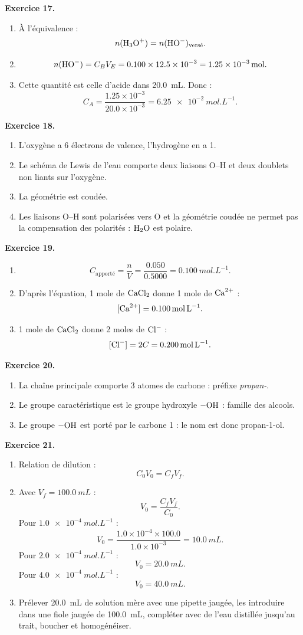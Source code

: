 \documentclass[11pt,a4paper]{article}
\newcommand{\corr}[2]{
  \begin{correctionbox}
  \textbf{Exercice #1.} #2
  \end{correctionbox}
}
\begin{document}
\corr{17}{
\begin{enumerate}
  \item À l'équivalence :
  \[
  n(\ce{H3O+})=n(\ce{HO-})_{\text{versé}}.
  \]
  \item
  \[
  n(\ce{HO-})=C_BV_E=0.100\times 12.5\times 10^{-3}=\SI{1.25e-3}{mol}.
  \]
  \item Cette quantité est celle d'acide dans \SI{20.0}{mL}. Donc :
  \[
  C_A=\frac{1.25\times 10^{-3}}{20.0\times 10^{-3}}=\SI{6.25e-2}{mol.L^{-1}}.
  \]
\end{enumerate}
}

\corr{18}{
\begin{enumerate}
  \item L'oxygène a 6 électrons de valence, l'hydrogène en a 1.
  \item Le schéma de Lewis de l'eau comporte deux liaisons O--H et deux doublets non liants sur l'oxygène.
  \item La géométrie est coudée.
  \item Les liaisons O--H sont polarisées vers O et la géométrie coudée ne permet pas la compensation des polarités : $\ce{H2O}$ est polaire.
\end{enumerate}
}

\corr{19}{
\begin{enumerate}
  \item
  \[
  C_{\text{apporté}}=\frac{n}{V}=\frac{0.050}{0.5000}=\SI{0.100}{mol.L^{-1}}.
  \]
  \item D'après l'équation, 1 mole de $\ce{CaCl2}$ donne 1 mole de $\ce{Ca^{2+}}$ :
  \[
  [\ce{Ca^{2+}}]=\SI{0.100}{mol.L^{-1}}.
  \]
  \item 1 mole de $\ce{CaCl2}$ donne 2 moles de $\ce{Cl-}$ :
  \[
  [\ce{Cl-}]=2C=\SI{0.200}{mol.L^{-1}}.
  \]
\end{enumerate}
}

\corr{20}{
\begin{enumerate}
  \item La chaîne principale comporte 3 atomes de carbone : préfixe \textit{propan-}.
  \item Le groupe caractéristique est le groupe hydroxyle $-\ce{OH}$ : famille des alcools.
  \item Le groupe $-\ce{OH}$ est porté par le carbone 1 : le nom est donc propan-1-ol.
\end{enumerate}
}

\corr{21}{
\begin{enumerate}
  \item Relation de dilution :
  \[
  C_0V_0=C_fV_f.
  \]
  \item Avec $V_f=\SI{100.0}{mL}$ :
  \[
  V_0=\frac{C_fV_f}{C_0}.
  \]
  Pour $\SI{1.0e-4}{mol.L^{-1}}$ :
  \[
  V_0=\frac{1.0\times 10^{-4}\times 100.0}{1.0\times 10^{-3}}=\SI{10.0}{mL}.
  \]
  Pour $\SI{2.0e-4}{mol.L^{-1}}$ :
  \[
  V_0=\SI{20.0}{mL}.
  \]
  Pour $\SI{4.0e-4}{mol.L^{-1}}$ :
  \[
  V_0=\SI{40.0}{mL}.
  \]
  \item Prélever \SI{20.0}{mL} de solution mère avec une pipette jaugée, les introduire dans une fiole jaugée de \SI{100.0}{mL}, compléter avec de l'eau distillée jusqu'au trait, boucher et homogénéiser.
\end{enumerate}
}
\end{document}
